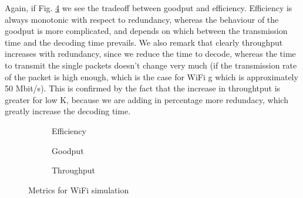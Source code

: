Again, if Fig. \ref{fig:wifi} we see the tradeoff between goodput and efficiency. Efficiency is always monotonic with respect to redundancy, whereas the behaviour of the goodput is more complicated, and depends on which between the transmission time and the decoding time prevails. We also remark that clearly throughput increases with redundancy, since we reduce the time to decode, whereas the time to transmit the single packets doesn't change very much (if the transmission rate of the packet is high enough, which is the case for WiFi g which is approximately 50 Mbit/s). This is confirmed by the fact that the increase in throughtput is greater for low K, because we are adding in percentage more redundacy, which greatly increase the decoding time. 
\begin{figure}[t]
\centering
\begin{subfigure}{0.23\textwidth}
	\captionsetup{justification=centering,font=scriptsize}
	\centering
	\setlength\fwidth{\textwidth}
	\setlength{}
	
	\caption{Efficiency}
	\label{fig:wifi_eff}
\end{subfigure}\hspace{2em}%
\begin{subfigure}{0.23\textwidth}
	\captionsetup{justification=centering,font=scriptsize}
	\centering
	\setlength\fwidth{\textwidth}
	\setlength{}
	
	\caption{Goodput}
	\label{fig:wifi_good}
\end{subfigure}\hspace{2em}%
\begin{subfigure}{0.23\textwidth}
	\captionsetup{justification=centering,font=scriptsize}
	\centering
	\setlength\fwidth{\textwidth}
	\setlength{}
	
	\caption{Throughput}
	\label{fig:wifi_thr}
\end{subfigure}
\caption{Metrics for WiFi simulation}
\label{fig:wifi}
\end{figure}
